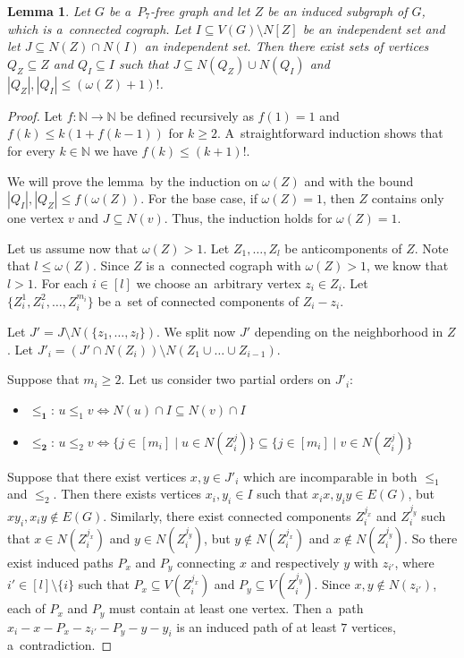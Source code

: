 \documentclass[11pt,a4paper]{article}
\newtheorem{lemma}[theorem]{Lemma}
\theoremstyle{definition}
\def\N{\mathbb{N}}
\begin{document}
\begin{lemma}\label{lem:ind_set_neighboring_cograph}
    Let $G$ be a~$P_7$-free graph and let $Z$ be an induced subgraph of $G$, which is a~connected cograph.  Let $I\subseteq V(G) \setminus N[Z]$ be an independent set and let $J\subseteq N(Z)\cap N(I)$ an independent set. Then there exist sets of vertices $Q_Z\subseteq Z$ and $Q_I\subseteq I$ such that $J\subseteq N(Q_Z)\cup N(Q_I)$ and $|Q_Z|, |Q_I| \leq (\omega(Z)+1)!$.
\end{lemma}
\begin{proof}
    Let $f\colon \N\to \N$ be defined recursively as $f(1) = 1$  and $f(k) \leq k(1+ f(k-1))$ for $k \geq 2$. A~straightforward induction shows that for every $k\in\N$
    we have $f(k) \leq (k+1)!$.
    
    We will prove the lemma~by the induction on $\omega(Z)$ and with the bound
    $|Q_I|, |Q_Z| \leq f(\omega(Z))$.
    For the base case, if $\omega(Z) = 1$, then $Z$ contains only one vertex $v$ and $J\subseteq N(v)$. Thus, the induction holds for $\omega(Z)=1$.

    Let us assume now that $\omega(Z) > 1$. Let $Z_1,\dots,Z_l$ be anticomponents of $Z$. Note that $l\leq \omega(Z)$. Since $Z$ is a~connected cograph with $\omega(Z) > 1$, we know that $l > 1$. For each $i\in [l]$ we choose an~arbitrary vertex $z_i\in Z_i$. Let $\{Z_i^1, Z_i^2, \dots, Z_i^{m_i}\}$ be a~set of connected components of $Z_i - z_i$.
    
    Let $J' = J\setminus N(\{z_1,\dots, z_l\})$. 
    We split now $J'$ depending on the neighborhood in $Z$. 
    Let $J'_i = (J'\cap N(Z_i))\setminus N(Z_1\cup  \dots \cup Z_{i-1})$. 
    
    Suppose that $m_i\geq 2$. Let us consider two partial orders on $J'_i$: 
    \begin{itemize}
        \item $\mathbf{\leq_1}$: $u \leq_1 v \Leftrightarrow N(u)\cap I \subseteq N(v)\cap I$
        \item $\mathbf{\leq_2}$: $u \leq_2 v \Leftrightarrow \{j\in [m_i]\mid u\in N  (Z_i^j)\} \subseteq \{j\in [m_i]\mid v\in N(Z_i^j)\}$
    \end{itemize}
    Suppose that there exist vertices $x, y\in J'_i$ which are incomparable in both $\leq_1$ and $\leq_2$. Then there exists vertices $x_i, y_i\in I$ such that $x_ix, y_iy \in E(G)$, but $xy_i, x_iy \notin E(G)$. 
    Similarly, there exist connected components $Z_i^{j_x}$ and $Z_i^{j_y}$ such that $x\in N(Z_i^{j_x})$ and $y\in N(Z_i^{j_y})$, but $y\notin N(Z_i^{j_x})$ and $x\notin N(Z_i^{j_y})$. 
    So there exist induced paths $P_x$ and $P_y$ connecting $x$ and respectively $y$ with $z_{i'}$, where $i'\in [l]\setminus\{i\}$ such that $P_x\subseteq V(Z_i^{j_x})$ and $P_y \subseteq V(Z_i^{j_y})$. Since $x,y \notin N(z_{i'})$, each of $P_x$ and $P_y$ must contain at least one vertex. Then a~path $x_i - x - P_x - z_{i'} - P_y - y-y_i$ is an induced path of at least $7$ vertices, a~contradiction.
    

\end{proof}
\end{document}
